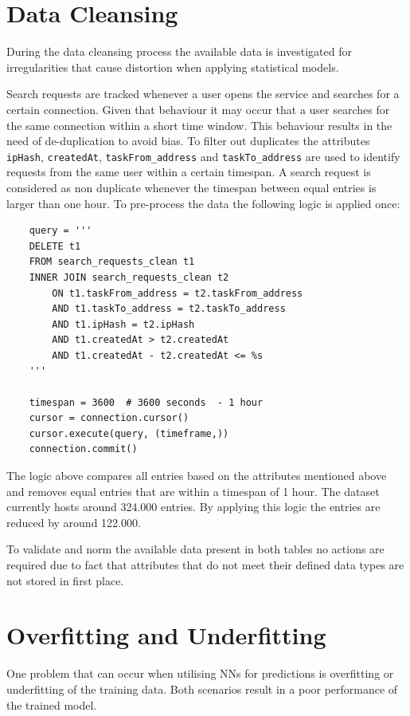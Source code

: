 \section{Data Cleansing}
\label{sec:data_cleansing}
During the data cleansing process the available data is investigated for irregularities that cause distortion when applying statistical models. 

Search requests are tracked whenever a user opens the service and searches for a certain connection. Given that behaviour it may occur that a user searches for the same connection within a short time window. This behaviour results in the need of de-duplication to avoid bias. To filter out duplicates the attributes \verb|ipHash|, \verb|createdAt|, \verb|taskFrom_address| and \verb|taskTo_address| are used to identify requests from the same user within a certain timespan. A search request is considered as non duplicate whenever the timespan between equal entries is larger than one hour. 
To pre-process the data the following logic is applied once:
\begin{lstlisting}
    query = '''
    DELETE t1
    FROM search_requests_clean t1
    INNER JOIN search_requests_clean t2
        ON t1.taskFrom_address = t2.taskFrom_address
        AND t1.taskTo_address = t2.taskTo_address
        AND t1.ipHash = t2.ipHash
        AND t1.createdAt > t2.createdAt
        AND t1.createdAt - t2.createdAt <= %s
	'''

    timespan = 3600  # 3600 seconds  - 1 hour
    cursor = connection.cursor()
    cursor.execute(query, (timeframe,))
    connection.commit()
\end{lstlisting}
The logic above compares all entries based on the attributes mentioned above and removes equal entries that are within a timespan of 1 hour. The dataset currently hosts around 324.000 entries. By applying this logic the entries are reduced by around 122.000. 

To validate and norm the available data present in both tables no actions are required due to fact that attributes that do not meet their defined data types are not stored in first place. 

\section{Overfitting and Underfitting}
One problem that can occur when utilising NNs for predictions is overfitting or underfitting of the training data. Both scenarios result in a poor performance of the trained model. \cite{fitting} 
